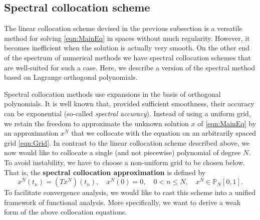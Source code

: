 \documentclass[12pt,a4paper]{article}
\begin{document}
\subsection{Spectral collocation scheme}
The linear collocation scheme devised in the previous subsection is a versatile method for solving \eqref{eqn:MainEq} in spaces without much regularity. However, it becomes inefficient when the solution is actually very smooth. On the other end of the spectrum of numerical methods we have spectral collocation schemes that are well-suited for such a case. Here, we describe a version of the spectral method based on Lagrange orthogonal polynomials.

Spectral collocation methods use expansions in the basis of orthogonal polynomials. It is well known that, provided sufficient smoothness, their accuracy can be exponential (so-called \textit{spectral accuracy}). Instead of using a uniform grid, we retain the freedom to approximate the unknown solution $x$ of \eqref{eqn:MainEq} by an approximation $x^N$ that we collocate with the equation on an arbitrarily spaced grid \eqref{eqn:Grid}. In contrast to the linear collocation scheme described above, we now would like to collocate a single (and not piecewise) polynomial of degree $N$. To avoid instability, we have to choose a non-uniform grid to be chosen below. That is, the \textbf{spectral collocation approximation} is defined by
\begin{equation}\label{eqn:SpectralCollocationScheme}
	x^N(t_n) = (Tx^N)(t_n), \quad x^N(0) = 0, \quad 0< n \leq N, \quad x^N \in \mathbb{P}_N[0,1].
\end{equation}
To facilitate convergence analysis, we would like to cast this scheme into a unified framework of functional analysis. More specifically, we want to derive a weak form of the above collocation equations. 
\end{document}
